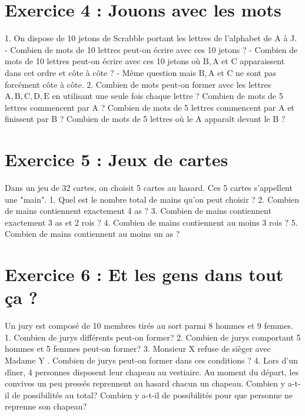 \section*{Exercice 4 : Jouons avec les mots}
1. On dispose de 10 jetons de Scrabble portant les lettres de l'alphabet de A à J.
- Combien de mots de 10 lettres peut-on écrire avec ces 10 jetons ?
- Combien de mots de 10 lettres peut-on écrire avec ces 10 jetons où \(\mathrm{B}, \mathrm{A}\) et C apparaissent dans cet ordre et côte à côte ?
- Même question mais \(\mathrm{B}, \mathrm{A}\) et C ne sont pas forcément côte à côte.
2. Combien de mots peut-on former avec les lettres \(\mathrm{A}, \mathrm{B}, \mathrm{C}, \mathrm{D}, \mathrm{E}\) en utilisant une seule fois chaque lettre ? Combien de mots de 5 lettres commencent par A ? Combien de mots de 5 lettres commencent par A et finissent par B ? Combien de mots de 5 lettres où le A apparaît devant le B ?

\section*{Exercice 5 : Jeux de cartes}

Dans un jeu de 32 cartes, on choisit 5 cartes au hasard. Ces 5 cartes s'appellent une "main".
1. Quel est le nombre total de mains qu'on peut choisir ?
2. Combien de mains contiennent exactement 4 as ?
3. Combien de mains contiennent exactement 3 as et 2 rois ?
4. Combien de mains contiennent au moins 3 rois ?
5. Combien de mains contiennent au moins un as ?

\section*{Exercice 6 : Et les gens dans tout ça ?}

Un jury est composé de 10 membres tirés au sort parmi 8 hommes et 9 femmes.
1. Combien de jurys différents peut-on former?
2. Combien de jurys comportant 5 hommes et 5 femmes peut-on former?
3. Monsieur X refuse de sièger avec Madame Y . Combien de jurys peut-on former dans ces conditions ?
4. Lors d'un dîner, 4 personnes disposent leur chapeau au vestiaire. Au moment du départ, les convives un peu pressés reprennent au hasard chacun un chapeau. Combien y a-t-il de possibilités au total? Combien y a-t-il de possibilités pour que personne ne reprenne son chapeau?
